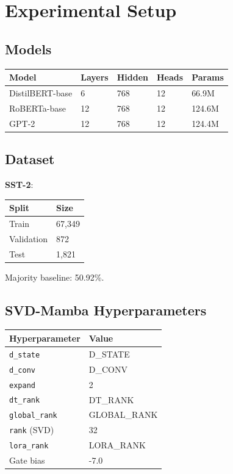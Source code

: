 
\section{Experimental Setup}

\subsection{Models}

\begin{table}[H]
\centering
\small
\begin{tabular}{lllll}
\toprule
\textbf{Model} & \textbf{Layers} & \textbf{Hidden} & \textbf{Heads} & \textbf{Params} \\
\midrule
DistilBERT-base & 6 & 768 & 12 & 66.9M \\
RoBERTa-base & 12 & 768 & 12 & 124.6M \\
GPT-2 & 12 & 768 & 12 & 124.4M \\
\bottomrule
\end{tabular}
\end{table}

\subsection{Dataset}

\textbf{SST-2}:

\begin{table}[H]
\centering
\small
\begin{tabular}{ll}
\toprule
\textbf{Split} & \textbf{Size} \\
\midrule
Train & 67,349 \\
Validation & 872 \\
Test & 1,821 \\
\bottomrule
\end{tabular}
\end{table}

Majority baseline: 50.92\%.

\subsection{SVD-Mamba Hyperparameters}

\begin{table}[H]
\centering
\small
\begin{tabular}{ll}
\toprule
\textbf{Hyperparameter} & \textbf{Value} \\
\midrule
\texttt{d\_state} & {{D\_STATE}} \\
\texttt{d\_conv} & {{D\_CONV}} \\
\texttt{expand} & 2 \\
\texttt{dt\_rank} & {{DT\_RANK}} \\
\texttt{global\_rank} & {{GLOBAL\_RANK}} \\
\texttt{rank} (SVD) & 32 \\
\texttt{lora\_rank} & {{LORA\_RANK}} \\
Gate bias & -7.0 \\
\bottomrule
\end{tabular}
\end{table}

